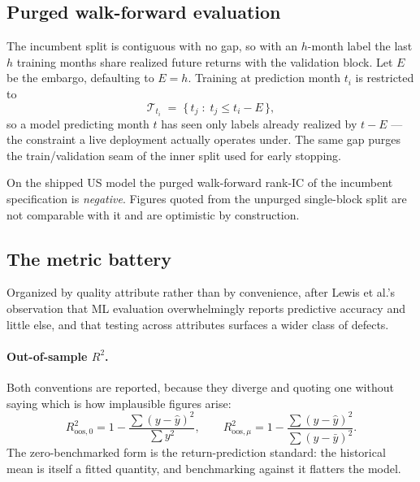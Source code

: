 \documentclass[11pt]{article}
\begin{document}
\subsection{Purged walk-forward evaluation}
\label{sec:purged}
The incumbent split is contiguous with no gap, so with an $h$-month label the last $h$
training months share realized future returns with the validation block. Let $E$ be
the embargo, defaulting to $E=h$. Training at prediction month $t_i$ is restricted to
\begin{equation}
  \mathcal T_{t_i} \;=\; \{\,t_j \;:\; t_j \le t_i - E\,\},
\end{equation}
so a model predicting month $t$ has seen only labels already realized by $t-E$ --- the
constraint a live deployment actually operates under. The same gap purges the
train/validation seam of the inner split used for early stopping.

\begin{notebox}
On the shipped US  model the purged walk-forward rank-IC of the
incumbent specification is \emph{negative}. Figures quoted from the unpurged
single-block split are not comparable with it and are optimistic by construction.
\end{notebox}

\subsection{The metric battery}
\label{sec:battery}
Organized by quality attribute rather than by convenience, after Lewis et al.'s
observation that ML evaluation overwhelmingly reports predictive accuracy and little
else, and that testing across attributes surfaces a wider class of defects.

\paragraph{Out-of-sample $R^2$.}
Both conventions are reported, because they diverge and quoting one without saying
which is how implausible figures arise:
\begin{equation}
  R^2_{\text{oos},0} = 1-\frac{\sum (y-\hat y)^2}{\sum y^2},
  \qquad
  R^2_{\text{oos},\mu} = 1-\frac{\sum (y-\hat y)^2}{\sum (y-\bar y)^2}.
\end{equation}
The zero-benchmarked form is the return-prediction standard: the historical mean is
itself a fitted quantity, and benchmarking against it flatters the model.
\end{document}
